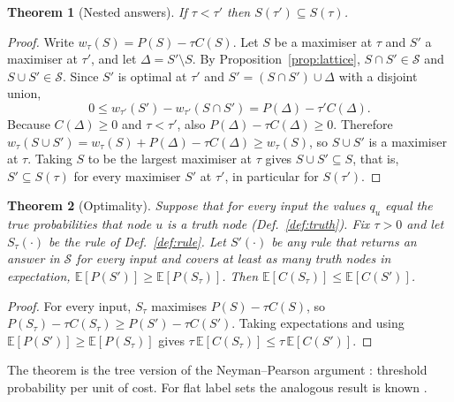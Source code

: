 \documentclass[11pt,a4paper]{article}
\newtheorem{theorem}{Theorem}
\theoremstyle{definition}
\theoremstyle{remark}
\newcommand{\cS}{\mathcal{S}}
\begin{document}
\begin{theorem}[Nested answers]\label{thm:nested}
If $\tau<\tau'$ then $S(\tau')\subseteq S(\tau)$.
\end{theorem}
\begin{proof}
Write $w_\tau(S)=P(S)-\tau C(S)$. Let $S$ be a maximiser at $\tau$ and $S'$ a maximiser at $\tau'$, and let
$\Delta=S'\setminus S$. By Proposition~\ref{prop:lattice}, $S\cap S'\in\cS$ and $S\cup S'\in\cS$. Since $S'$ is optimal
at $\tau'$ and $S'=(S\cap S')\cup\Delta$ with a disjoint union,
\[
0\le w_{\tau'}(S')-w_{\tau'}(S\cap S')=P(\Delta)-\tau'C(\Delta).
\]
Because $C(\Delta)\ge0$ and $\tau<\tau'$, also $P(\Delta)-\tau C(\Delta)\ge0$. Therefore
$w_\tau(S\cup S')=w_\tau(S)+P(\Delta)-\tau C(\Delta)\ge w_\tau(S)$, so $S\cup S'$ is a maximiser at $\tau$. Taking $S$
to be the largest maximiser at $\tau$ gives $S\cup S'\subseteq S$, that is, $S'\subseteq S(\tau)$ for every
maximiser $S'$ at $\tau'$, in particular for $S(\tau')$.
\end{proof}

\begin{theorem}[Optimality]\label{thm:optimal}
Suppose that for every input the values $q_u$ equal the true probabilities that node $u$ is a truth node
(Def.~\ref{def:truth}). Fix $\tau>0$ and let $S_\tau(\cdot)$ be the rule of Def.~\ref{def:rule}. Let $S'(\cdot)$ be
any rule that returns an answer in $\cS$ for every input and covers at least as many truth nodes in expectation,
$\mathbb{E}[P(S')]\ge\mathbb{E}[P(S_\tau)]$. Then $\mathbb{E}[C(S_\tau)]\le\mathbb{E}[C(S')]$.
\end{theorem}
\begin{proof}
For every input, $S_\tau$ maximises $P(S)-\tau C(S)$, so $P(S_\tau)-\tau C(S_\tau)\ge P(S')-\tau C(S')$. Taking
expectations and using $\mathbb{E}[P(S')]\ge\mathbb{E}[P(S_\tau)]$ gives $\tau\,\mathbb{E}[C(S_\tau)]\le\tau\,
\mathbb{E}[C(S')]$.
\end{proof}
\noindent The theorem is the tree version of the Neyman--Pearson argument \cite{np}: threshold probability per unit
of cost. For flat label sets the analogous result is known \cite{sadinle}.
\end{document}
